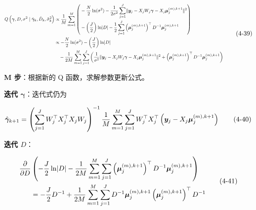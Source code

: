 \documentclass[12pt,a4paper]{ctexart}
\makeatletter
\numberwithin{figure}{section}
\numberwithin{table}{section}
\let\ltx@orig@tag\tag
\renewcommand{\tag}[1]{\refstepcounter{equation}\ltx@orig@tag{#1}}%
\makeatother
\begin{document}
\begin{equation}
\resizebox{\linewidth}{!}{$\displaystyle
\begin{aligned}
Q\left(\boldsymbol{\gamma},D,\sigma^2\mid \hat{\boldsymbol{\gamma}}_k,\hat{D}_k,\hat{\sigma}_k^2\right)
&\propto\frac{1}{M}\sum_{m=1}^{M}\left(
\begin{aligned}
&-\frac{N}{2}\ln(\sigma^2)-\frac{1}{2\sigma^2}\sum_{j=1}^{J}
\lVert \boldsymbol{y}_j-X_jW_j\boldsymbol{\gamma}-X_j\boldsymbol{\mu}_j^{(m),k+1}\rVert^2\\
&-\left(\frac{J}{2}\right)\ln\lvert D\rvert-\frac{1}{2}\sum_{j=1}^{J}
\left(\boldsymbol{\mu}_j^{(m),k+1}\right)^{\top}D^{-1}\boldsymbol{\mu}_j^{(m),k+1}
\end{aligned}
\right)\\
&\propto-\frac{N}{2}\ln(\sigma^2)-\left(\frac{J}{2}\right)\ln\lvert D\rvert\\
&\quad-\frac{1}{2M}\sum_{m=1}^{M}\sum_{j=1}^{J}
\left(
\frac{1}{\sigma^2}\lVert \boldsymbol{y}_j-X_jW_j\boldsymbol{\gamma}-X_j\boldsymbol{\mu}_j^{(m),k+1}\rVert^2+
\left(\boldsymbol{\mu}_j^{(m),k+1}\right)^{\top}D^{-1}\boldsymbol{\mu}_j^{(m),k+1}
\right)
\end{aligned}
$}
\tag{4-39}
\end{equation}

\textbf{M 步}：根据新的 Q 函数，求解参数更新公式。

\textbf{迭代 $\boldsymbol{\gamma}$}：迭代式仍为

\begin{equation}
\hat{\boldsymbol{\gamma}}_{k+1}=\left(\sum_{j=1}^{J}W_j^{\top}X_j^{\top}X_jW_j\right)^{-1}
\frac{1}{M}\sum_{m=1}^{M}\sum_{j=1}^{J}W_j^{\top}X_j^{\top}
\left(\boldsymbol{y}_j-X_j\boldsymbol{\mu}_j^{(m),k+1}\right)
\tag{4-40}\label{eq:4-40}
\end{equation}

\textbf{迭代 $D$}：

\begin{equation}
\begin{aligned}
\frac{\partial}{\partial D}
&\left(-\frac{J}{2}\ln\lvert D\rvert-\frac{1}{2M}\sum_{m=1}^{M}\sum_{j=1}^{J}
\left(\boldsymbol{\mu}_j^{(m),k+1}\right)^{\top}D^{-1}\boldsymbol{\mu}_j^{(m),k+1}\right)\\
&=-\frac{J}{2}D^{-1}+\frac{1}{2M}\sum_{m=1}^{M}\sum_{j=1}^{J}
D^{-1}\boldsymbol{\mu}_j^{(m),k+1}\left(\boldsymbol{\mu}_j^{(m),k+1}\right)^{\top}D^{-1}
\end{aligned}
\tag{4-41}
\end{equation}
\end{document}
